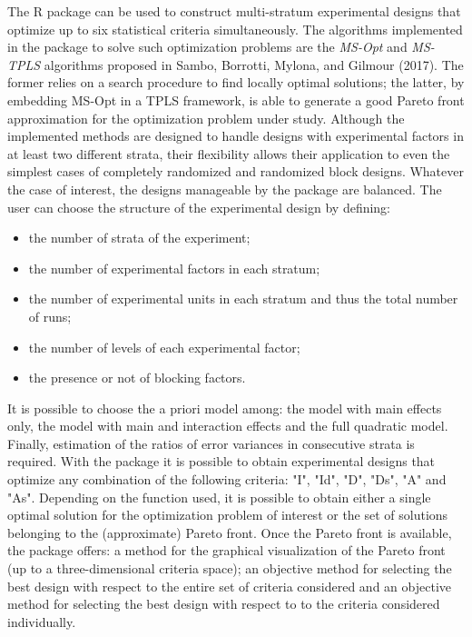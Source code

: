\documentclass[a4paper]{book}
\begin{document}
\begin{Description}\relax
The R package  can be used to construct
multi-stratum experimental designs that optimize up to six statistical
criteria simultaneously. The algorithms implemented in the package to solve
such optimization problems are the \emph{MS-Opt} and \emph{MS-TPLS} algorithms
proposed in Sambo, Borrotti, Mylona, and Gilmour (2017). The former relies on
a search procedure to find locally optimal solutions; the latter, by embedding
MS-Opt in a TPLS framework, is able to generate a good Pareto front
approximation for the optimization problem under study.
Although the implemented methods are designed to handle designs with
experimental factors in at least two different strata, their flexibility
allows their application to even the simplest cases of completely randomized
and randomized block designs. Whatever the case of interest, the designs
manageable by the package are balanced. The user can choose the structure of
the experimental design by defining:
\begin{itemize}

\item{} the number of strata of the experiment;
\item{} the number of experimental factors in each stratum;
\item{} the number of experimental units in each stratum and thus the total number of runs;
\item{} the number of levels of each experimental factor;
\item{} the presence or not of blocking factors.

\end{itemize}

It is possible to choose the a priori model among: the model with main effects
only, the model with main and interaction effects and the full quadratic model.
Finally, estimation of the ratios of error variances in consecutive strata is
required. With the package  it is possible to obtain experimental
designs that optimize any combination of the following criteria: "I", "Id",
"D", "Ds", "A" and "As". Depending on the function used, it is possible to obtain
either a single optimal solution for the optimization problem of interest or
the set of solutions belonging to the (approximate) Pareto front. Once the
Pareto front is available, the package offers: a method for the graphical
visualization of the Pareto front (up to a three-dimensional criteria space);
an objective method for selecting the best design with respect to the entire
set of criteria considered and an objective method for selecting the best design
with respect to to the criteria considered individually.
\end{Description}
\end{document}
